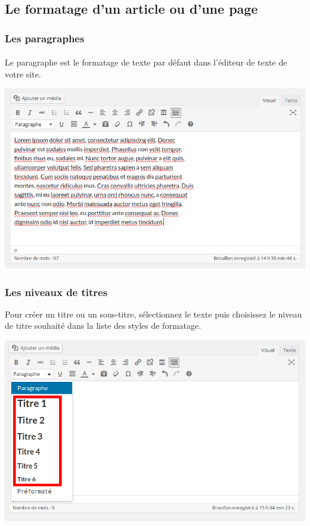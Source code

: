 \documentclass[10pt,a4paper]{article}
\begin{document}
\subsection{Le formatage d'un article ou d'une page}
\subsubsection{Les paragraphes}
\paragraph{} Le paragraphe est le formatage de texte par défaut dans l'éditeur de texte de votre site.
\begin{center}
\includegraphics[scale=0.35]{img/0071.png}
\end{center}
\subsubsection{Les niveaux de titres}
Pour créer un titre ou un sous-titre, sélectionnez le texte puis choisissez le niveau de titre souhaité dans la liste des styles de formatage.
\begin{center}
\includegraphics[scale=0.35]{img/0072.png}
\end{center}
\end{document}
